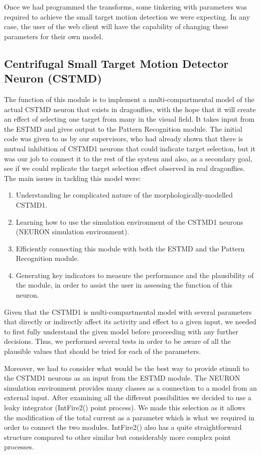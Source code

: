 \documentclass[a4paper,11pt]{article}
\begin{document}
Once we had programmed the transforms, some tinkering with parameters was required to achieve the small target motion detection we were expecting. In any case, the user of the web client will have the capability of changing these parameters for their own model.

\subsection{Centrifugal Small Target Motion Detector Neuron (CSTMD)}

The function of this module is to implement a multi-compartmental model of the actual CSTMD neuron that exists in dragonflies, with the hope that it will create an effect of selecting one target from many in the visual field. It takes input from the ESTMD and gives output to the Pattern Recognition module. The initial code was given to us by our supervisors, who had already shown that there is mutual inhibition of CSTMD1 neurons that could indicate target selection, but it was our job to connect it to the rest of the system and also, as a secondary goal, see if we could replicate the target selection effect observed in real dragonflies. The main issues in tackling this model were:
\begin{enumerate}
	\item Understanding he complicated nature of the morphologically-modelled CSTMD1.
	\item Learning how to use the simulation environment of the CSTMD1 neurons (NEURON simulation environment).\cite{neuron}
	\item Efficiently connecting this module with both the ESTMD and the Pattern Recognition module.
	\item Generating key indicators to measure the performance and the plausibility of the module, in order to assist the user in assessing the function of this neuron.
\end{enumerate}

Given that the CSTMD1 is multi-compartmental model with several parameters that directly or indirectly affect its activity and effect to a given input, we needed to first fully understand the given model before proceeding with any further decisions. Thus, we performed several tests in order to be aware of all the plausible values that should be tried for each of the parameters.

Moreover, we had to consider what would be the best way to provide stimuli to the CSTMD1 neurons as an input from the ESTMD module. The NEURON simulation environment provides many classes as a connection to a model from an external input. After examining all the different possibilities we decided to use a leaky integrator (IntFire2() point process). We made this selection as it allows the modification of the total current as a parameter which is what we required in order to connect the two modules. IntFire2() also has a quite straightforward structure compared to other similar but considerably more complex point processes. 
\end{document}
